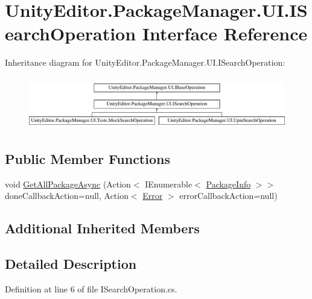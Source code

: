 \hypertarget{interface_unity_editor_1_1_package_manager_1_1_u_i_1_1_i_search_operation}{}\section{Unity\+Editor.\+Package\+Manager.\+U\+I.\+I\+Search\+Operation Interface Reference}
\label{interface_unity_editor_1_1_package_manager_1_1_u_i_1_1_i_search_operation}
Inheritance diagram for Unity\+Editor.\+Package\+Manager.\+U\+I.\+I\+Search\+Operation\+:\begin{figure}[H]
\begin{center}
\leavevmode
\includegraphics[height=2.301370cm]{interface_unity_editor_1_1_package_manager_1_1_u_i_1_1_i_search_operation}
\end{center}
\end{figure}
\subsection*{Public Member Functions}
\begin{DoxyCompactItemize}
\item 
void \mbox{\hyperlink{interface_unity_editor_1_1_package_manager_1_1_u_i_1_1_i_search_operation_af96c1798a1e3b84d88c4da64dcb1f05d}{Get\+All\+Package\+Async}} (Action$<$ I\+Enumerable$<$ \mbox{\hyperlink{class_unity_editor_1_1_package_manager_1_1_u_i_1_1_package_info}{Package\+Info}} $>$$>$ done\+Callback\+Action=null, Action$<$ \mbox{\hyperlink{namespace_unity_editor_1_1_package_manager_1_1_u_i_ab1815eb3e48074893d9dc1dc99a4a32aa902b0d55fddef6f8d651fe1035b7d4bd}{Error}} $>$ error\+Callback\+Action=null)
\end{DoxyCompactItemize}
\subsection*{Additional Inherited Members}


\subsection{Detailed Description}


Definition at line 6 of file I\+Search\+Operation.\+cs.



